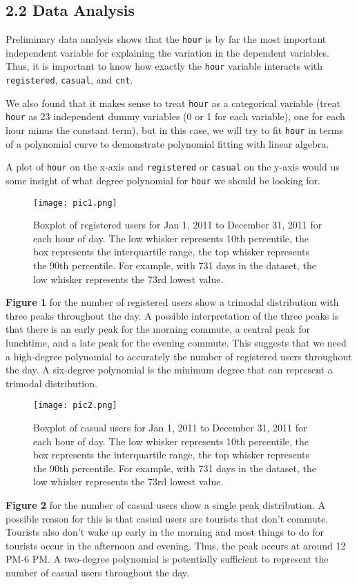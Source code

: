 \documentclass[
]{article}
\begin{document}
\hypertarget{data-analysis}{%
\subsection{2.2 Data Analysis}\label{data-analysis}}

Preliminary data analysis shows that the \texttt{hour} is by far the most important independent variable for explaining the variation in the dependent variables. Thus, it is important to know how exactly the \texttt{hour} variable interacts with \texttt{registered}, \texttt{casual}, and \texttt{cnt}.

We also found that it makes sense to treat \texttt{hour} as a
categorical variable (treat \texttt{hour} as 23 independent dummy
variables (0 or 1 for each variable), one for each hour minus the
constant term), but in this case, we will try to fit \texttt{hour} in terms of a polynomial curve to demonstrate polynomial fitting with linear algebra.

A plot of \texttt{hour} on the x-axis and \texttt{registered} or
\texttt{casual} on the y-axis would us some insight of what degree polynomial for \texttt{hour} we should be looking for.

\begin{figure}
\centering
\texttt{[image: pic1.png]}
\caption{Boxplot of registered users for Jan 1, 2011 to December 31, 2011 for each hour of day. The low whisker represents 10th percentile, the box represents the interquartile range, the top whisker represents the 90th percentile. For example, with 731 days in the dataset, the low whisker represents the 73rd lowest value.}
\end{figure}

\textbf{Figure 1} for the number of registered users show a trimodal distribution with three peaks throughout the day. A possible interpretation of the three peaks is that there is an early peak for the morning commute, a central peak for lunchtime, and a late peak for the evening commute. This suggests that we need a high-degree polynomial to accurately the number of registered users throughout the day. A six-degree polynomial is the minimum degree that can represent a trimodal distribution.

\begin{figure}
\centering
\texttt{[image: pic2.png]}
\caption{Boxplot of casual users for Jan 1, 2011 to December 31, 2011 for each hour of day. The low whisker represents 10th percentile, the box represents the interquartile range, the top whisker represents the 90th percentile. For example, with 731 days in the dataset, the low whisker represents the 73rd lowest value.}
\end{figure}
\newpage
\textbf{Figure 2} for the number of casual users show a single peak distribution. A possible reason for this is that casual users are tourists that don't commute. Tourists also don't wake up early in the morning and most things to do for tourists occur in the afternoon and evening. Thus, the peak occurs at around 12 PM-6 PM. A two-degree polynomial is potentially sufficient to represent the number of casual users throughout the day.
\end{document}
